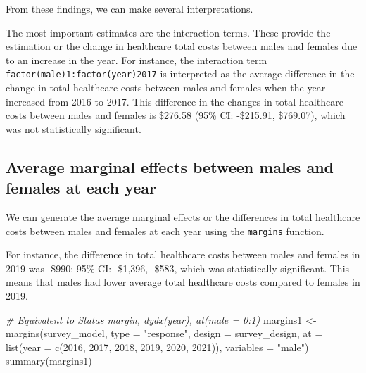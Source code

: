 \documentclass[
]{book}
\newenvironment{Shaded}{\begin{snugshade}}{\end{snugshade}}
\newcommand{\AttributeTok}[1]{\textcolor[rgb]{0.77,0.63,0.00}{#1}}
\newcommand{\CommentTok}[1]{\textcolor[rgb]{0.56,0.35,0.01}{\textit{#1}}}
\newcommand{\DecValTok}[1]{\textcolor[rgb]{0.00,0.00,0.81}{#1}}
\newcommand{\FunctionTok}[1]{\textcolor[rgb]{0.00,0.00,0.00}{#1}}
\newcommand{\NormalTok}[1]{#1}
\newcommand{\OtherTok}[1]{\textcolor[rgb]{0.56,0.35,0.01}{#1}}
\newcommand{\StringTok}[1]{\textcolor[rgb]{0.31,0.60,0.02}{#1}}
\begin{document}
From these findings, we can make several interpretations.

The most important estimates are the interaction terms. These provide the estimation or the change in healthcare total costs between males and females due to an increase in the year. For instance, the interaction term \texttt{factor(male)1:factor(year)2017} is interpreted as the average difference in the change in total healthcare costs between males and females when the year increased from 2016 to 2017. This difference in the changes in total healthcare costs between males and females is \$276.58 (95\% CI: -\$215.91, \$769.07), which was not statistically significant.

\hypertarget{average-marginal-effects-between-males-and-females-at-each-year}{%
\subsection{Average marginal effects between males and females at each year}\label{average-marginal-effects-between-males-and-females-at-each-year}}

We can generate the average marginal effects or the differences in total healthcare costs between males and females at each year using the \texttt{margins} function.

For instance, the difference in total healthcare costs between males and females in 2019 was -\$990; 95\% CI: -\$1,396, -\$583, which was statistically significant. This means that males had lower average total healthcare costs compared to females in 2019.

\begin{Shaded}
\begin{Highlighting}[]
\CommentTok{\# Equivalent to Stata\textquotesingle{}s margin, dydx(year), at(male = 0:1)}
\NormalTok{margins1 }\OtherTok{\textless{}{-}} \FunctionTok{margins}\NormalTok{(survey\_model, }\AttributeTok{type =} \StringTok{"response"}\NormalTok{, }\AttributeTok{design =}\NormalTok{ survey\_design, }\AttributeTok{at =} \FunctionTok{list}\NormalTok{(}\AttributeTok{year =} \FunctionTok{c}\NormalTok{(}\DecValTok{2016}\NormalTok{, }\DecValTok{2017}\NormalTok{, }\DecValTok{2018}\NormalTok{, }\DecValTok{2019}\NormalTok{, }\DecValTok{2020}\NormalTok{, }\DecValTok{2021}\NormalTok{)), }\AttributeTok{variables =} \StringTok{"male"}\NormalTok{)}
\FunctionTok{summary}\NormalTok{(margins1)}
\end{Highlighting}
\end{Shaded}
\end{document}
